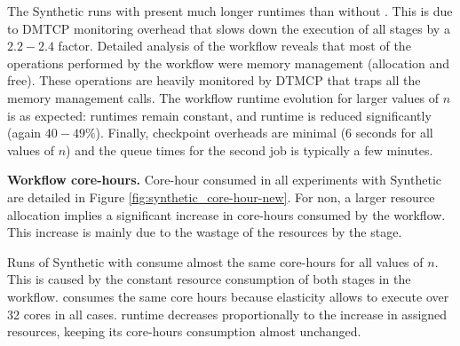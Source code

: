 The Synthetic runs with \systemname present much
longer runtimes than without \systemname.
This is due to  %
DMTCP monitoring overhead that slows down 
the execution of all stages by a $2.2-2.4$ factor.
Detailed analysis of the workflow reveals 
that most of the operations performed by the workflow
were memory management
(allocation and free). 
These operations are heavily monitored
by DTMCP that traps all the memory management calls. %
The workflow runtime evolution
for larger values of $n$ is as expected:
\synFirst runtimes remain constant, and
\synSecond runtime is reduced significantly
(again  $40-49\%$). 
Finally, \systemname checkpoint overheads 
are minimal (6 seconds for all values of $n$)
and the queue times for the second job is typically a few minutes.

\noindent\textbf{Workflow core-hours.}
Core-hour consumed in all experiments with Synthetic
are detailed in Figure \ref{fig:synthetic_core-hour-new}. 
For  non\systemname, a larger resource allocation
implies a significant increase in core-hours
consumed by the workflow.
This increase is mainly due to 
the wastage of the resources by the \synFirst stage. 

Runs of Synthetic with \systemname consume
almost the same core-hours for all values of $n$.
This is caused by the constant resource consumption
of both stages in the workflow.
\synFirst consumes the same core hours because
elasticity %
allows to execute \synFirst over 32 cores in all cases.
\synSecond  runtime decreases proportionally to
the increase in assigned resources, keeping
its core-hours consumption almost unchanged.




